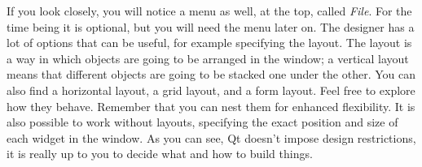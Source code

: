 

If you look closely, you will notice a menu as well, at the top, called
\emph{File}. For the time being it is optional, but you will need the
menu later on. The designer has a lot of options that can be useful, for
example specifying the layout. The layout is a way in which objects are
going to be arranged in the window; a vertical layout means that
different objects are going to be stacked one under the other. You can
also find a horizontal layout, a grid layout, and a form layout. Feel
free to explore how they behave. Remember that you can nest them for
enhanced flexibility. It is also possible to work without layouts,
specifying the exact position and size of each widget in the window. As
you can see, Qt doesn't impose design restrictions, it is really up to
you to decide what and how to build things.




